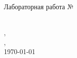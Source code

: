 \begin{center}   
	\large{Лабораторная работа № \labnumber\\ \hfill \break\Large{\textbf{\labwork}}}\\
    \normalsize
    \begin{flushright}
    \nameone, \groupone \\
    \nametwo, \grouptwo \\
    \today
    \end{flushright}
\end{center}
